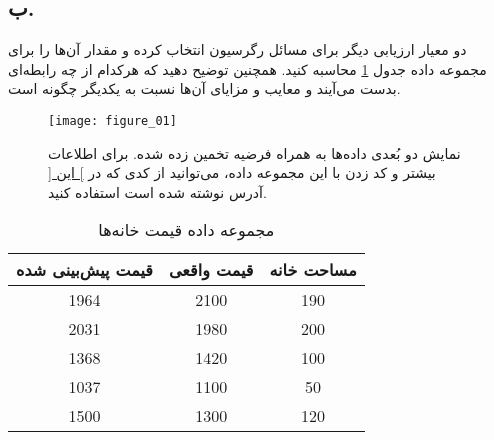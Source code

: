 \subsection*{ب.}
دو معیار ارزیابی دیگر برای مسائل رگرسیون انتخاب کرده و مقدار آن‌ها را برای مجموعه داده جدول \ref{tb1} محاسبه کنید. همچنین توضیح دهید که هرکدام از چه رابطه‌ای بدست می‌آیند و معایب و مزایای آن‌ها نسبت به یکدیگر چگونه است.

\begin{figure}
	\centering
	\texttt{[image: figure\_01]}
	\caption{
		نمایش دو بُعدی داده‌ها به همراه فرضیه تخمین زده شده. برای اطلاعات بیشتر و کد زدن با این مجموعه داده، می‌توانید از کدی که در 
		\href{https://github.com/Sinahjafari/machine-learning-course/blob/main/jupyter_notebooks/regression/simple_regression_for_evaluation.ipynb}{
		\big] این \big[
		}
		آدرس نوشته شده است استفاده کنید.
	}
	\label{fig1}
\end{figure}

\begin{table}
	\centering
	\caption{مجموعه داده قیمت خانه‌ها}
	\label{tb1}
	\begin{tabular}{ccc}
		\toprule
		قیمت پیش‌بینی شده & قیمت واقعی & مساحت خانه \\
		\midrule
		1964 & 2100 & 190 \\
		2031 & 1980 & 200 \\
		1368 & 1420 & 100 \\
		1037 & 1100 & 50 \\
		1500 & 1300 & 120 \\
		\bottomrule
	\end{tabular}
\end{table}